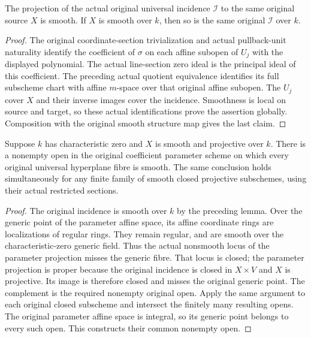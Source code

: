 \begin{lemma}
\label{lem:kn-nadel-bertini-incidence-bundle}
The projection of the actual original universal incidence $\mathcal I$
to the same original source $X$ is smooth. If $X$ is smooth over $k$,
then so is the same original $\mathcal I$ over $k$.
\end{lemma}
\begin{proof}
The original coordinate-section trivialization and actual pullback-unit
naturality identify the coefficient of $\sigma$ on each affine subopen
of $U_j$ with the displayed polynomial.  The actual line-section zero
ideal is the principal ideal of this coefficient.  The preceding actual
quotient equivalence identifies its full subscheme chart with affine
$m$-space over that original affine subopen.  The $U_j$ cover $X$ and
their inverse images cover the incidence.  Smoothness is local on source
and target, so these actual identifications prove the assertion globally.
Composition with the original smooth structure map gives the last claim.
\end{proof}

\begin{lemma}
\label{lem:kn-nadel-bertini-smooth-parameter-open}
Suppose $k$ has characteristic zero and $X$ is smooth and projective over
$k$.  There is a nonempty open in the original coefficient parameter
scheme on which every original universal hyperplane fibre is smooth.
The same conclusion holds simultaneously for any finite family of smooth
closed projective subschemes, using their actual restricted sections.
\end{lemma}
\begin{proof}
The original incidence is smooth over $k$ by the preceding lemma. Over the
generic point of the parameter affine space, its affine coordinate rings
are localizations of regular rings. They remain regular, and are smooth
over the characteristic-zero generic field. Thus the actual nonsmooth
locus of the parameter projection misses the generic fibre. That locus is
closed; the parameter projection is proper because the original incidence
is closed in $X\times V$ and $X$ is projective. Its image is therefore
closed and misses the original generic point. The complement is the
required nonempty original open. Apply the same argument to each original
closed subscheme and intersect the finitely many resulting opens. The
original parameter affine space is integral, so its generic point belongs
to every such open. This constructs their common nonempty open.
\end{proof}

